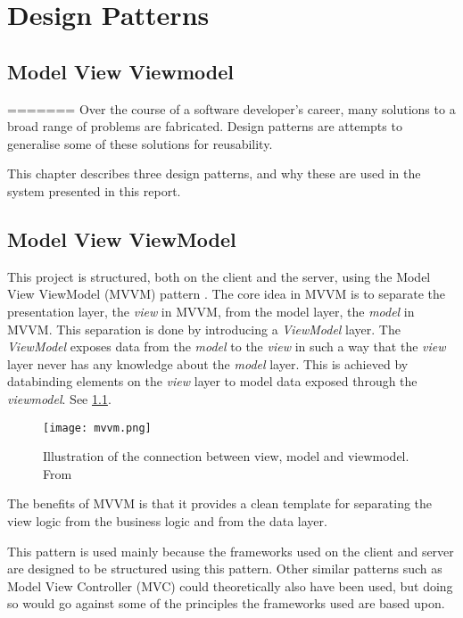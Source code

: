 \chapter{Design Patterns}


\section{Model View Viewmodel}
=======
Over the course of a software developer's career, many solutions to a broad range of
problems are fabricated. Design patterns are attempts to generalise some of these solutions
for reusability.

This chapter describes three design patterns, and why these are used
in the system presented in this report.

\section{Model View ViewModel}

This project is structured, both on the client and the server, using
the Model View ViewModel (MVVM) pattern \cite{mvvm}. The core idea in MVVM is to
separate the presentation layer, the \textit{view} in MVVM, from the model
layer, the \textit{model} in MVVM. This separation is done by introducing a
\textit{ViewModel} layer. The \textit{ViewModel} exposes data from the \textit{model} to the \textit{view}
in such a way that the \textit{view} layer never has any knowledge about the
\textit{model} layer. This is achieved by databinding elements on the \textit{view}
layer to model data exposed through the \textit{viewmodel}. See \cref{fig:mvvm}.

\begin{figure}
  \centering
  \texttt{[image: mvvm.png]}
  \caption{Illustration of the connection between view, model and
    viewmodel. From \cite{mvvm}}\label{fig:mvvm}
\end{figure}

The benefits of MVVM is that it provides a clean template for
separating the view logic from the business logic and from the data
layer.

This pattern is used mainly because the frameworks used on the client
and server are designed to be structured using this pattern. Other
similar patterns such as Model View Controller (MVC) could
theoretically also have been used, but doing so would go against some
of the principles the frameworks used are based upon.

